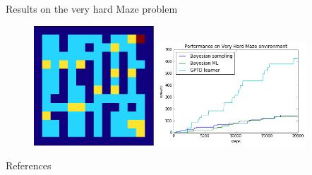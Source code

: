 \documentclass{beamer}
\begin{document}
\begin{frame}{Results on the very hard Maze problem}
\begin{figure}[!htb]
\centering
\includegraphics[width=0.4\textwidth]{veryhardmaze}
\includegraphics[width=0.5\textwidth]{veryHardMazePerf}
\end{figure}
\end{frame}

\begin{frame}{References}


\end{frame}
\end{document}
